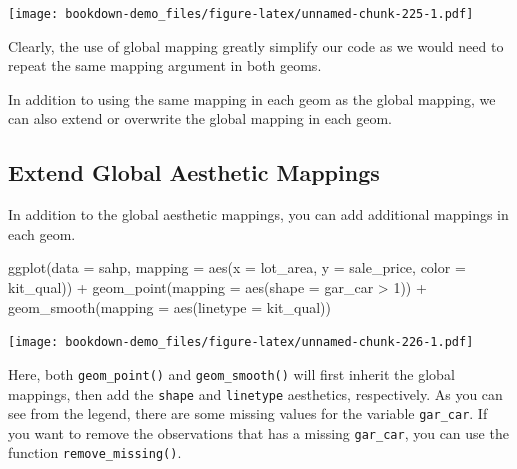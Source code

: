 \documentclass[
]{book}
\newenvironment{Shaded}{\begin{snugshade}}{\end{snugshade}}
\newcommand{\AttributeTok}[1]{\textcolor[rgb]{0.77,0.63,0.00}{#1}}
\newcommand{\DecValTok}[1]{\textcolor[rgb]{0.00,0.00,0.81}{#1}}
\newcommand{\FunctionTok}[1]{\textcolor[rgb]{0.00,0.00,0.00}{#1}}
\newcommand{\NormalTok}[1]{#1}
\newcommand{\SpecialCharTok}[1]{\textcolor[rgb]{0.00,0.00,0.00}{#1}}
\begin{document}
\texttt{[image: bookdown-demo\_files/figure-latex/unnamed-chunk-225-1.pdf]}

Clearly, the use of global mapping greatly simplify our code as we would need to repeat the same mapping argument in both geoms.

In addition to using the same mapping in each geom as the global mapping, we can also extend or overwrite the global mapping in each geom.

\hypertarget{extend-global-aesthetic-mappings}{%
\subsection{Extend Global Aesthetic Mappings}\label{extend-global-aesthetic-mappings}}

In addition to the global aesthetic mappings, you can add additional mappings in each geom.

\begin{Shaded}
\begin{Highlighting}[]
\FunctionTok{ggplot}\NormalTok{(}\AttributeTok{data =}\NormalTok{ sahp, }\AttributeTok{mapping =} \FunctionTok{aes}\NormalTok{(}\AttributeTok{x =}\NormalTok{ lot\_area, }\AttributeTok{y =}\NormalTok{ sale\_price, }\AttributeTok{color =}\NormalTok{ kit\_qual)) }\SpecialCharTok{+} \FunctionTok{geom\_point}\NormalTok{(}\AttributeTok{mapping =} \FunctionTok{aes}\NormalTok{(}\AttributeTok{shape =}\NormalTok{ gar\_car }\SpecialCharTok{\textgreater{}} \DecValTok{1}\NormalTok{)) }\SpecialCharTok{+} \FunctionTok{geom\_smooth}\NormalTok{(}\AttributeTok{mapping =} \FunctionTok{aes}\NormalTok{(}\AttributeTok{linetype =}\NormalTok{ kit\_qual))}
\end{Highlighting}
\end{Shaded}

\texttt{[image: bookdown-demo\_files/figure-latex/unnamed-chunk-226-1.pdf]}

Here, both \texttt{geom\_point()} and \texttt{geom\_smooth()} will first inherit the global mappings, then add the \texttt{shape} and \texttt{linetype} aesthetics, respectively. As you can see from the legend, there are some missing values for the variable \texttt{gar\_car}. If you want to remove the observations that has a missing \texttt{gar\_car}, you can use the function \texttt{remove\_missing()}.
\end{document}
